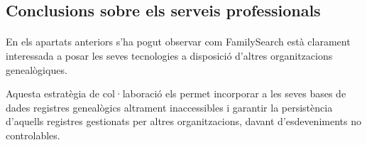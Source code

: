     \subsection{Conclusions sobre els serveis professionals}

    \paragraph{}
    En els apartats anteriors s'ha pogut observar com FamilySearch està clarament interessada a posar les seves tecnologies a disposició d'altres organitzacions genealògiques.

    Aquesta estratègia de col·laboració els permet incorporar a les seves bases de dades registres genealògics altrament inaccessibles i garantir la persistència d'aquells registres gestionats per altres organitzacions, davant d'esdeveniments no controlables.
